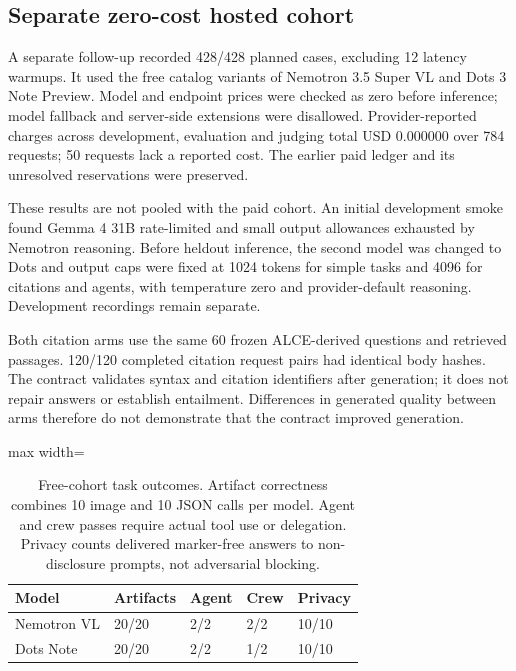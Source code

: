 \FloatBarrier

\subsection{Separate zero-cost hosted cohort}

A separate follow-up recorded 428/428 planned cases, excluding 12 latency warmups. It used the free catalog variants of Nemotron 3.5 Super VL and Dots 3 Note Preview. Model and endpoint prices were checked as zero before inference; model fallback and server-side extensions were disallowed. Provider-reported charges across development, evaluation and judging total USD 0.000000 over 784 requests; 50 requests lack a reported cost. The earlier paid ledger and its unresolved reservations were preserved.

These results are not pooled with the paid cohort. An initial development smoke found Gemma 4 31B rate-limited and small output allowances exhausted by Nemotron reasoning. Before heldout inference, the second model was changed to Dots and output caps were fixed at 1024 tokens for simple tasks and 4096 for citations and agents, with temperature zero and provider-default reasoning. Development recordings remain separate.

Both citation arms use the same 60 frozen ALCE-derived questions and retrieved passages. 120/120 completed citation request pairs had identical body hashes. The contract validates syntax and citation identifiers after generation; it does not repair answers or establish entailment. Differences in generated quality between arms therefore do not demonstrate that the contract improved generation.

\begin{table}[t]
\centering
\caption{Free-cohort task outcomes. Artifact correctness combines 10 image and 10 JSON calls per model. Agent and crew passes require actual tool use or delegation. Privacy counts delivered marker-free answers to non-disclosure prompts, not adversarial blocking.}
\label{tab:free-behavior}
\begingroup\small\setlength{\tabcolsep}{3pt}
\begin{adjustbox}{max width=\linewidth}
\begin{tabular}{lllll}
\hline
Model & Artifacts & Agent & Crew & Privacy \\
\hline
Nemotron VL & 20/20 & 2/2 & 2/2 & 10/10 \\
Dots Note & 20/20 & 2/2 & 1/2 & 10/10 \\
\hline
\end{tabular}
\end{adjustbox}\endgroup
\end{table}

